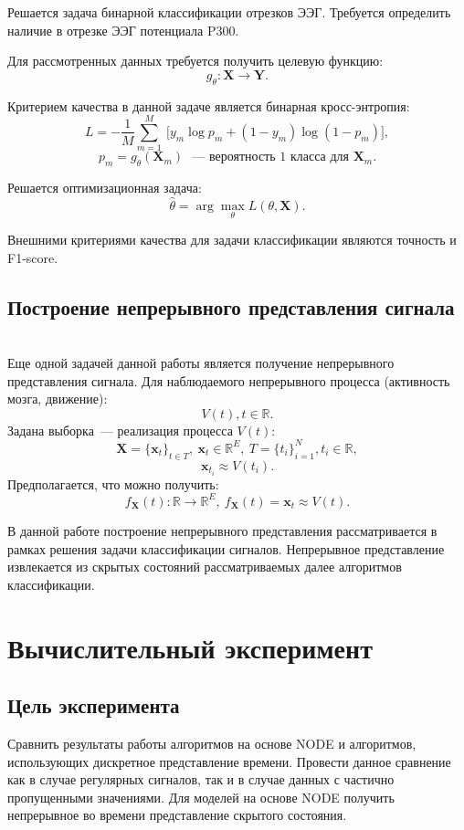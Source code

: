 \documentclass{article}
\newcommand{\x}{\mathbf{x}}
\newcommand{\Y}{\mathbf{Y}}
\newcommand{\X}{\mathbf{X}}
\newcommand{\R}{\mathbb{R}}
\begin{document}
    Решается задача бинарной классификации отрезков ЭЭГ. Требуется определить наличие в отрезке ЭЭГ потенциала P300.
    
    Для рассмотренных данных требуется получить целевую функцию:
    $$g_{\theta}: \X \to \Y.$$
    
    Критерием качества в данной задаче является бинарная кросс-энтропия: 
    $$L =  -{\frac {1}{M}}\sum _{m=1}^{M}\ {\bigg [}y_{m}\log {p}_{m}+(1-y_{m})\log(1-{p}_{m}){\bigg ]},$$
    $$p_m = g_{\theta}(\X_m) \text{ ~--- вероятность 1 класса для } \X_m.$$

    Решается оптимизационная задача:
    \begin{equation*}
    \hat{\theta} = \arg\max_{\theta} L(\theta, \X).
    \end{equation*}
    
    Внешними критериями качества для задачи классификации являются точность и F1-score.
    
\subsection{Построение непрерывного представления сигнала}\\
    
    Еще одной задачей данной работы является получение непрерывного представления сигнала. 
    Для наблюдаемого непрерывного процесса (активность мозга, движение):
    $$V(t), t \in \R.$$
    Задана выборка~--- реализация процесса $V(t)$:
    $$\X = \{\x_t\}_{t\in T},\  \x_t \in \R^E,\  T = \{t_i\}_{i=1}^{N}, t_i \in \R,$$ 
    $$\x_{t_i} \approx V(t_i).$$
    Предполагается, что можно получить:
    $$f_{\X}(t): \R \to \R^E, \ f_{\X}(t) = \x_t \approx V(t).$$

    В данной работе построение непрерывного представления рассматривается в рамках решения задачи классификации сигналов. Непрерывное представление извлекается из скрытых состояний рассматриваемых далее алгоритмов классификации.


\section{Вычислительный эксперимент}

\subsection{Цель эксперимента}

Сравнить результаты работы алгоритмов на основе NODE и алгоритмов, использующих дискретное представление времени. Провести данное сравнение как в случае регулярных сигналов, так и в случае данных с частично пропущенными значениями. Для моделей на основе NODE получить непрерывное во времени представление скрытого состояния.
\end{document}

